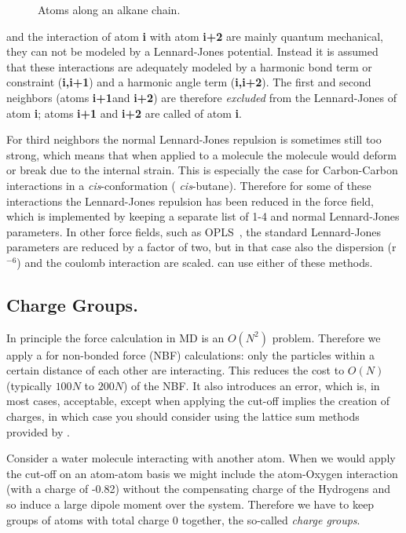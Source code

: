 \begin{figure}
\centerline{}
\caption{Atoms along an alkane chain.}
\label{fig:chain}
\end{figure}

and the interaction of atom {\bf i} with atom {\bf i+2} are mainly
quantum mechanical, they can not be modeled by a Lennard-Jones potential.
Instead it is assumed that these interactions are adequately modeled
by a harmonic bond term or constraint ({\bf i,i+1}) and a harmonic angle term
({\bf i,i+2}). The first and second neighbors (atoms {\bf i+1}and {\bf i+2}) 
are therefore
{\em excluded} from the Lennard-Jones  
of atom {\bf i};
atoms {\bf i+1} and {\bf i+2} are called {\em {}} of atom {\bf i}.

For third neighbors the normal Lennard-Jones repulsion is sometimes
still too strong, which means that when applied to a molecule the
molecule would deform or break due to the internal strain. This is
especially the case for Carbon-Carbon interactions in a {\em
cis}-conformation ({\eg} {\em cis}-butane).  Therefore for some of these
interactions the Lennard-Jones repulsion has been reduced in the
{\gromos} force field, which is implemented by keeping a separate list of
1-4 and normal Lennard-Jones parameters. In other force fields, such
as OPLS~\cite{Jorgensen88}, the standard Lennard-Jones parameters are reduced
by a factor of two, but in that case also the dispersion (r$^{-6}$)
and the coulomb interaction are scaled.
{\gromacs} can use either of these methods.

\subsection{Charge Groups.}
\label{sec:cg}
In principle the force calculation in MD is an $O(N^2)$ problem.
Therefore we apply a  for non-bonded force (NBF)
calculations: only the particles within a certain distance of each
other are interacting. This reduces the cost to $O(N)$ (typically
$100N$ to $200N$) of the NBF. It also introduces an error, which is,
in most cases, acceptable, except when applying the cut-off implies
the creation of charges, in which case you should consider using the
lattice sum methods provided by {\gromacs}.

Consider a water molecule interacting with another atom. When we would apply
the cut-off on an atom-atom basis we might include the atom-Oxygen
interaction (with a charge of -0.82) without the compensating charge
of the Hydrogens and so induce a large dipole moment over the system.
Therefore we have to keep groups of atoms with total charge
0 together, the so-called {\em charge groups}.

